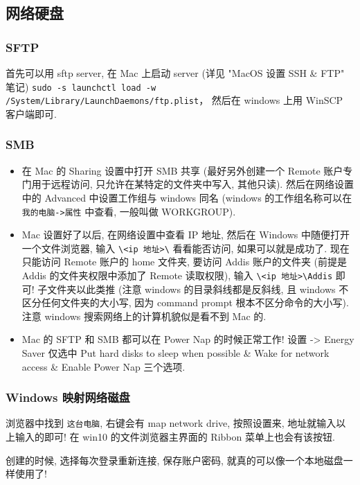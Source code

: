\subsection{网络硬盘}
\subsubsection{SFTP}
首先可以用 sftp server, 在 Mac 上启动 server (详见 "MacOS 设置 SSH & FTP" 笔记)
\verb|sudo -s launchctl load -w /System/Library/LaunchDaemons/ftp.plist|， 然后在 windows 上用 WinSCP 客户端即可.

\subsubsection{SMB}
\begin{itemize}
\item 在 Mac 的 Sharing 设置中打开 SMB 共享 (最好另外创建一个 Remote 账户专门用于远程访问, 只允许在某特定的文件夹中写入, 其他只读). 然后在网络设置中的 Advanced 中设置工作组与 windows 同名 (windows 的工作组名称可以在 \verb|我的电脑->属性| 中查看, 一般叫做 WORKGROUP).

\item Mac 设置好了以后, 在网络设置中查看 IP 地址, 然后在 Windows 中随便打开一个文件浏览器, 输入 \verb|\<ip 地址>\| 看看能否访问, 如果可以就是成功了. 现在只能访问 Remote 账户的 home 文件夹, 要访问 Addis 账户的文件夹 (前提是 Addis 的文件夹权限中添加了 Remote 读取权限), 输入 \verb|\<ip 地址>\Addis| 即可! 子文件夹以此类推 (注意 windows 的目录斜线都是反斜线, 且 windows 不区分任何文件夹的大小写, 因为 command prompt 根本不区分命令的大小写). 注意 windows 搜索网络上的计算机貌似是看不到 Mac 的.

\item Mac 的 SFTP 和 SMB 都可以在 Power Nap 的时候正常工作! 设置 -> Energy Saver 仅选中 Put hard disks to sleep when possible & Wake for network access & Enable Power Nap 三个选项.
\end{itemize}

\subsubsection{Windows 映射网络磁盘}
浏览器中找到 \verb|这台电脑|, 右键会有 map network drive, 按照设置来, 地址就输入以上输入的即可! 在 win10 的文件浏览器主界面的 Ribbon 菜单上也会有该按钮.

创建的时候, 选择每次登录重新连接, 保存账户密码, 就真的可以像一个本地磁盘一样使用了!

